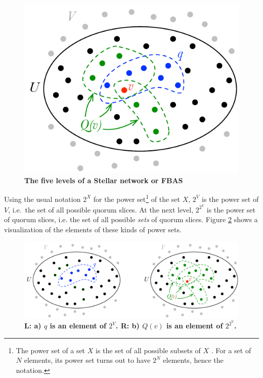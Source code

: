 \begin{figure}[h]
\centering
\includegraphics[width=7 cm]{Figures/vqQUV}
\caption{\bf \small The five levels of a Stellar network or FBAS}
\label{fig:vqQUV}
\end{figure}

Using the usual notation $2^X$ for the power set\footnote{The power set of a set $X$ is the set of all possible subsets of $X$ \cite{Cameron2008}. For a set of $N$ elements, its power set turns out to have $2^N$ elements, hence the notation.} of the set $X$, $2^V$ is the power set of $V$, i.e.\ the set of all possible quorum slices. At the next level, $2^{2^V}$ is the power set of quorum slices, i.e. the set of all possible \emph{sets} of quorum slices. Figure \ref{fig:SliceAndQ} shows a visualization of the elements of these kinds of power sets.

\begin{figure}[h]
\centering
\includegraphics[width=15 cm]{Figures/SliceAndQ}
\caption{\bf \small L: a) $q$ is an element of $2^V$. R: b) $Q(v)$ is an element of $2^{2^V}$.}
\label{fig:SliceAndQ}
\end{figure}

